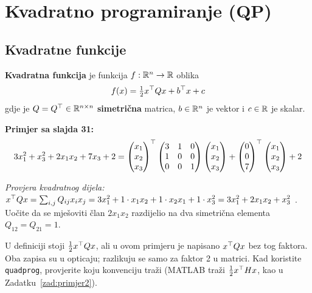 \section{Kvadratno programiranje (QP)}

\subsection{Kvadratne funkcije}

\begin{definicija}
\textbf{Kvadratna funkcija} je funkcija $f : \mathbb{R}^n \to \mathbb{R}$ oblika
\[
f(x) = \tfrac12 x^{\top} Qx + b^{\top} x + c
\]
gdje je $Q = Q^{\top} \in \mathbb{R}^{n\times n}$ \textbf{simetrična} matrica, $b \in \mathbb{R}^n$
je vektor i $c \in \mathbb{R}$ je skalar.
\end{definicija}

\textbf{Primjer sa slajda 31:}
\[
3x_1^2 + x_3^2 + 2x_1x_2 + 7x_3 + 2 =
\begin{pmatrix}x_1\\x_2\\x_3\end{pmatrix}^{\top}
\begin{pmatrix}3&1&0\\1&0&0\\0&0&1\end{pmatrix}
\begin{pmatrix}x_1\\x_2\\x_3\end{pmatrix}
+ \begin{pmatrix}0\\0\\7\end{pmatrix}^{\top}
\begin{pmatrix}x_1\\x_2\\x_3\end{pmatrix} + 2
\]

\emph{Provjera kvadratnog dijela:} $x^{\top} Qx = \sum_{i,j}Q_{ij}x_ix_j
= 3x_1^2 + 1\cdot x_1x_2 + 1\cdot x_2x_1 + 1\cdot x_3^2
= 3x_1^2 + 2x_1x_2 + x_3^2$ \checkmark. Uočite da se mješoviti član $2x_1x_2$
razdijelio na dva simetrična elementa $Q_{12} = Q_{21} = 1$.

\begin{napomena}
U definiciji stoji $\tfrac12 x^{\top} Qx$, ali u ovom primjeru je napisano
$x^{\top} Qx$ bez tog faktora. Oba zapisa su u opticaju; razlikuju se samo za faktor
2 u matrici. Kad koristite \texttt{quadprog}, provjerite koju konvenciju traži
(MATLAB traži $\tfrac12 x^{\top} Hx$, kao u Zadatku~\ref{zad:primjer2}).
\end{napomena}

